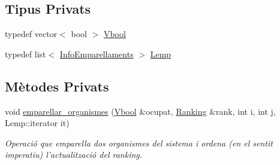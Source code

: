\subsection*{Tipus Privats}
\begin{DoxyCompactItemize}
\item 
typedef vector$<$ bool $>$ \hyperlink{class_sistema_aed93022dab0bed25a0b6439559ea1b8b}{Vbool}
\item 
typedef list$<$ \hyperlink{struct_sistema_1_1_info_emparellaments}{Info\-Emparellaments} $>$ \hyperlink{class_sistema_ad3aa7da7cab0f54bf8c67b62b7b1e8ef}{Lemp}
\end{DoxyCompactItemize}
\subsection*{Mètodes Privats}
\begin{DoxyCompactItemize}
\item 
void \hyperlink{class_sistema_a13f288276b20ffc386edd42964b60277}{emparellar\-\_\-organismes} (\hyperlink{class_sistema_aed93022dab0bed25a0b6439559ea1b8b}{Vbool} \&ocupat, \hyperlink{class_ranking}{Ranking} \&rank, int i, int j, Lemp\-::iterator it)
\begin{DoxyCompactList}\small\item\em Operació que emparella dos organismes del sistema i ordena (en el sentit imperatiu) l'actualització del ranking. \end{DoxyCompactList}\end{DoxyCompactItemize}
